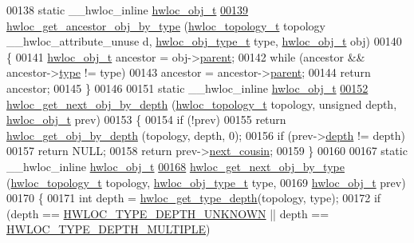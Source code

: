 \begin{DoxyCode}
00138 \textcolor{keyword}{static} \_\_hwloc\_inline \hyperlink{a00016}{hwloc_obj_t}
\hypertarget{a00031_source_l00139}{}\hyperlink{a00053_gac93e1a95a71add57ac841daef1b94e5e}{00139} \hyperlink{a00053_gac93e1a95a71add57ac841daef1b94e5e}{hwloc_get_ancestor_obj_by_type} (\hyperlink{a00039_ga9d1e76ee15a7dee158b786c30b6a6e38}{hwloc_topology_t} topology \_\_hwloc\_attribute\_unuse
      d, \hyperlink{a00041_gacd37bb612667dc437d66bfb175a8dc55}{hwloc_obj_type_t} type, \hyperlink{a00016}{hwloc_obj_t} obj)
00140 \{
00141   \hyperlink{a00016}{hwloc_obj_t} ancestor = obj->\hyperlink{a00016_adc494f6aed939992be1c55cca5822900}{parent};
00142   \textcolor{keywordflow}{while} (ancestor && ancestor->\hyperlink{a00016_acc4f0803f244867e68fe0036800be5de}{type} != type)
00143     ancestor = ancestor->\hyperlink{a00016_adc494f6aed939992be1c55cca5822900}{parent};
00144   \textcolor{keywordflow}{return} ancestor;
00145 \}
00146 
00151 \textcolor{keyword}{static} \_\_hwloc\_inline \hyperlink{a00016}{hwloc_obj_t}
\hypertarget{a00031_source_l00152}{}\hyperlink{a00053_gab7c1dce3f42ece5bfa621e87cf332418}{00152} \hyperlink{a00053_gab7c1dce3f42ece5bfa621e87cf332418}{hwloc_get_next_obj_by_depth} (\hyperlink{a00039_ga9d1e76ee15a7dee158b786c30b6a6e38}{hwloc_topology_t} topology, \textcolor{keywordtype}{unsigned} depth, 
      \hyperlink{a00016}{hwloc_obj_t} prev)
00153 \{
00154   \textcolor{keywordflow}{if} (!prev)
00155     \textcolor{keywordflow}{return} \hyperlink{a00047_gaedd78240b0c1108355586a268ec5a697}{hwloc_get_obj_by_depth} (topology, depth, 0);
00156   \textcolor{keywordflow}{if} (prev->\hyperlink{a00016_a9d82690370275d42d652eccdea5d3ee5}{depth} != depth)
00157     \textcolor{keywordflow}{return} NULL;
00158   \textcolor{keywordflow}{return} prev->\hyperlink{a00016_a85a788017457129589318b6c39451acf}{next_cousin};
00159 \}
00160 
00167 \textcolor{keyword}{static} \_\_hwloc\_inline \hyperlink{a00016}{hwloc_obj_t}
\hypertarget{a00031_source_l00168}{}\hyperlink{a00053_ga5f08ceb69375341e73563cfe2e77534e}{00168} \hyperlink{a00053_ga5f08ceb69375341e73563cfe2e77534e}{hwloc_get_next_obj_by_type} (\hyperlink{a00039_ga9d1e76ee15a7dee158b786c30b6a6e38}{hwloc_topology_t} topology, \hyperlink{a00041_gacd37bb612667dc437d66bfb175a8dc55}{hwloc_obj_type_t} type,
00169                    \hyperlink{a00016}{hwloc_obj_t} prev)
00170 \{
00171   \textcolor{keywordtype}{int} depth = \hyperlink{a00046_gaea7c64dd59467f5201ba87712710b14d}{hwloc_get_type_depth}(topology, type);
00172   \textcolor{keywordflow}{if} (depth == \hyperlink{a00046_ggaf4e663cf42bbe20756b849c6293ef575a0565ab92ab72cb0cec91e23003294aad}{HWLOC_TYPE_DEPTH_UNKNOWN} || depth == \hyperlink{a00046_ggaf4e663cf42bbe20756b849c6293ef575ae99465995cacde6c210d5fc2e409798c}{HWLOC_TYPE_DEPTH_MULTIPLE})

\end{DoxyCode}
